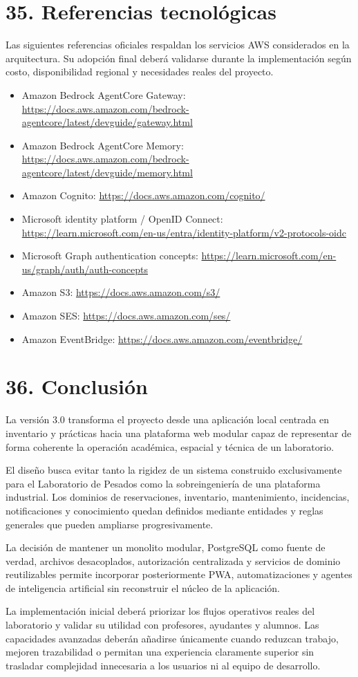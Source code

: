 \documentclass[12pt]{article}
\begin{document}
\section*{35. Referencias tecnológicas}

Las siguientes referencias oficiales respaldan los servicios AWS considerados en la arquitectura. Su adopción final deberá validarse durante la implementación según costo, disponibilidad regional y necesidades reales del proyecto.

\begin{itemize}[leftmargin=1.2cm]
    \item Amazon Bedrock AgentCore Gateway: \url{https://docs.aws.amazon.com/bedrock-agentcore/latest/devguide/gateway.html}
    \item Amazon Bedrock AgentCore Memory: \url{https://docs.aws.amazon.com/bedrock-agentcore/latest/devguide/memory.html}
    \item Amazon Cognito: \url{https://docs.aws.amazon.com/cognito/}
    \item Microsoft identity platform / OpenID Connect: \url{https://learn.microsoft.com/en-us/entra/identity-platform/v2-protocols-oidc}
    \item Microsoft Graph authentication concepts: \url{https://learn.microsoft.com/en-us/graph/auth/auth-concepts}
    \item Amazon S3: \url{https://docs.aws.amazon.com/s3/}
    \item Amazon SES: \url{https://docs.aws.amazon.com/ses/}
    \item Amazon EventBridge: \url{https://docs.aws.amazon.com/eventbridge/}
\end{itemize}

\section*{36. Conclusión}

La versión 3.0 transforma el proyecto desde una aplicación local centrada en inventario y prácticas hacia una plataforma web modular capaz de representar de forma coherente la operación académica, espacial y técnica de un laboratorio.

El diseño busca evitar tanto la rigidez de un sistema construido exclusivamente para el Laboratorio de Pesados como la sobreingeniería de una plataforma industrial. Los dominios de reservaciones, inventario, mantenimiento, incidencias, notificaciones y conocimiento quedan definidos mediante entidades y reglas generales que pueden ampliarse progresivamente.

La decisión de mantener un monolito modular, PostgreSQL como fuente de verdad, archivos desacoplados, autorización centralizada y servicios de dominio reutilizables permite incorporar posteriormente PWA, automatizaciones y agentes de inteligencia artificial sin reconstruir el núcleo de la aplicación.

La implementación inicial deberá priorizar los flujos operativos reales del laboratorio y validar su utilidad con profesores, ayudantes y alumnos. Las capacidades avanzadas deberán añadirse únicamente cuando reduzcan trabajo, mejoren trazabilidad o permitan una experiencia claramente superior sin trasladar complejidad innecesaria a los usuarios ni al equipo de desarrollo.
\end{document}
